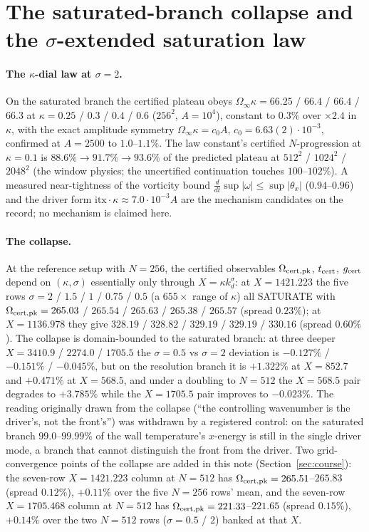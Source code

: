 \documentclass[11pt,a4paper]{article}
\newcommand{\abs}[1]{\lvert #1 \rvert}
\newcommand{\kd}{k_d}
\newcommand{\Om}{\Omega_{\rm cert,pk}}
\newcommand{\tcert}{t_{\rm cert}}
\begin{document}
\section{The saturated-branch collapse and the \texorpdfstring{$\sigma$}{sigma}-extended saturation law}\label{sec:law}

\paragraph{The $\kappa$-dial law at $\sigma=2$.} On the saturated branch the certified plateau obeys $\Omega_\infty\kappa=66.25$ / $66.4$ / $66.4$ / $66.3$ at $\kappa=0.25$ / $0.3$ / $0.4$ / $0.6$ ($256^2$, $A=10^4$), constant to $0.3\%$ over $\times2.4$ in $\kappa$, with the exact amplitude symmetry $\Omega_\infty\kappa=c_0A$, $c_0=6.63(2)\cdot10^{-3}$, confirmed at $A=2500$ to $1.0$--$1.1\%$. The law constant's certified $N$-progression at $\kappa=0.1$ is $88.6\%\to91.7\%\to93.6\%$ of the predicted plateau at $512^2$ / $1024^2$ / $2048^2$ (the window physics; the uncertified continuation touches $100$--$102\%$). A measured near-tightness of the vorticity bound $\frac{d}{dt}\sup\abs\omega\le\sup\abs{\theta_x}$ ($0.94$--$0.96$) and the driver form $\mathrm{itx}\cdot\kappa\approx7.0\cdot10^{-3}A$ are the mechanism candidates on the record; no mechanism is claimed here.

\paragraph{The collapse.} At the reference setup with $N=256$, the certified observables $\Om$, $\tcert$, $g_{\rm cert}$ depend on $(\kappa,\sigma)$ essentially only through $X=\kappa\kd^\sigma$: at $X=1421.223$ the five rows $\sigma=2$ / $1.5$ / $1$ / $0.75$ / $0.5$ (a $655\times$ range of $\kappa$) all SATURATE with $\Om=265.03$ / $265.54$ / $265.63$ / $265.38$ / $265.57$ (spread $0.23\%$); at $X=1136.978$ they give $328.19$ / $328.82$ / $329.19$ / $329.19$ / $330.16$ (spread $0.60\%$). The collapse is domain-bounded to the saturated branch: at three deeper $X=3410.9$ / $2274.0$ / $1705.5$ the $\sigma=0.5$ vs $\sigma=2$ deviation is $-0.127\%$ / $-0.151\%$ / $-0.045\%$, but on the resolution branch it is $+1.322\%$ at $X=852.7$ and $+0.471\%$ at $X=568.5$, and under a doubling to $N=512$ the $X=568.5$ pair degrades to $+3.785\%$ while the $X=1705.5$ pair improves to $-0.023\%$. The reading originally drawn from the collapse (``the controlling wavenumber is the driver's, not the front's'') was withdrawn by a registered control: on the saturated branch $99.0$--$99.99\%$ of the wall temperature's $x$-energy is still in the single driver mode, a branch that cannot distinguish the front from the driver. Two grid-convergence points of the collapse are added in this note (Section~\ref{sec:course}): the seven-row $X=1421.223$ column at $N=512$ has $\Om=265.51$--$265.83$ (spread $0.12\%$), $+0.11\%$ over the five $N=256$ rows' mean, and the seven-row $X=1705.468$ column at $N=512$ has $\Om=221.33$--$221.65$ (spread $0.15\%$), $+0.14\%$ over the two $N=512$ rows ($\sigma=0.5$ / $2$) banked at that $X$.
\end{document}
